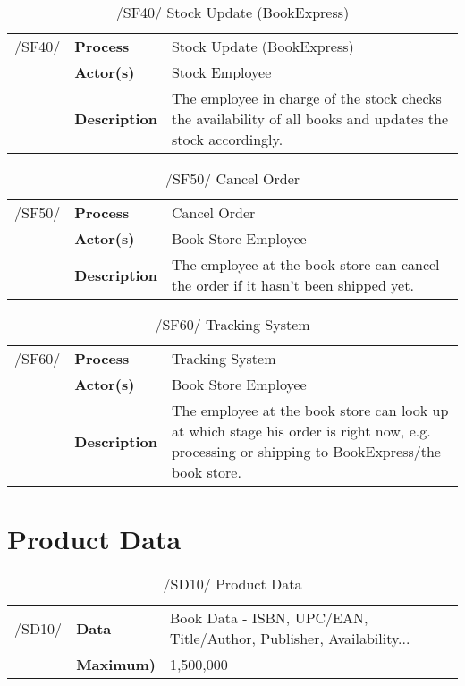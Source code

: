 \documentclass[11pt,a4paper,oneside,svgnames]{report}
\begin{document}
\begin{table}[H]
\centering
\begin{tabular}{p{1.5cm}p{3cm}p{8cm}}
\cellcolor{white}/SF40/	& \textbf{Process}	&  Stock Update (BookExpress)\\
\cellcolor{white}		& \textbf{Actor(s)} &  Stock Employee  \\
\cellcolor{white}		& \textbf{Description}	 & The employee in charge of the stock checks the availability of all books and updates the stock accordingly. \\
\end{tabular}
\caption{/SF40/  Stock Update (BookExpress)}
\end{table}


\begin{table}[H]
\centering
\begin{tabular}{p{1.5cm}p{3cm}p{8cm}}
\cellcolor{white}/SF50/	& \textbf{Process}	& Cancel Order \\
\cellcolor{white}		& \textbf{Actor(s)} &   Book Store Employee\\
\cellcolor{white}		& \textbf{Description}	 &  The employee at the book store can cancel the order if it hasn't been shipped yet. \\
\end{tabular}
\caption{/SF50/ Cancel Order}
\end{table}

\begin{table}[H]
\centering
\begin{tabular}{p{1.5cm}p{3cm}p{8cm}}
\cellcolor{white}/SF60/	& \textbf{Process}	&  Tracking System \\
\cellcolor{white}		& \textbf{Actor(s)} &  Book Store Employee\\
\cellcolor{white}		& \textbf{Description}	 &  The employee at the book store can look up at which stage his order is right now, e.g. processing or shipping to BookExpress/the book store.\\
\end{tabular}
\caption{/SF60/ Tracking System }
\end{table}

\chapter{Product Data}

\begin{table}[H]
\centering
\begin{tabular}{p{1.5cm}p{3cm}p{8cm}}
\cellcolor{white}/SD10/	& \textbf{Data}	& Book Data - ISBN, UPC/EAN, Title/Author, Publisher, Availability... \\
\cellcolor{white}	 & \textbf{Maximum)} &  1,500,000\\
\end{tabular}
\caption{/SD10/ Product Data }
\end{table}
\end{document}
